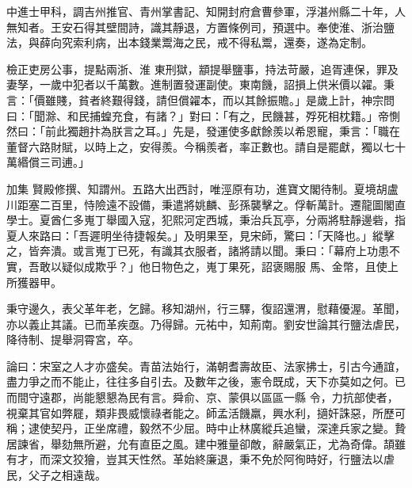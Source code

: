 \begin{pinyinscope}
 中進士甲科，調吉州推官、青州掌書記、知開封府倉曹參軍，浮湛州縣二十年，人無知者。王安石得其壁間詩，識其靜退，方置條例司，預選中。奉使淮、浙治鹽法，與薛向究索利病，出本錢業鬻海之民，戒不得私鬻，還奏，遂為定制。



 檢正吏房公事，提點兩浙、淮
 東刑獄，顓提舉鹽事，持法苛嚴，追胥連保，罪及妻孥，一歲中犯者以千萬數。進制置發運副使。東南饑，詔損上供米價以糴。秉言：「價雖賤，貧者終艱得錢，請但償糴本，而以其餘振贍。」是歲上計，神宗問曰：「聞滁、和民捕蝗充食，有諸？」對曰：「有之，民饑甚，殍死相枕籍。」帝惻然曰：「前此獨趙抃為朕言之耳。」先是，發運使多獻餘羨以希恩寵，秉言：「職在董督六路財賦，以時上之，安得羨。今稱羨者，率正數也。請自是罷獻，獨以七十萬緡償三司逋。」



 加集
 賢殿修撰、知謂州。五路大出西討，唯涇原有功，進寶文閣待制。夏境胡盧川距塞二百里，恃險遠不設備，秉遣將姚麟、彭孫襲擊之。俘斬萬計。遷龍圖閣直學士。夏酋仁多嵬丁舉國入寇，犯熙河定西城，秉治兵瓦亭，分兩將駐靜邊砦，指夏人來路曰：「吾遲明坐待捷報矣。」及明果至，見宋師，驚曰：「天降也。」縱擊之，皆奔潰。或言嵬丁已死，有識其衣服者，諸將請以聞。秉曰：「幕府上功患不實，吾敢以疑似成欺乎？」他日物色之，嵬丁果死，詔褒賜服
 馬、金幣，且使上所獲器甲。



 秉守邊久，表父革年老，乞歸。移知湖州，行三驛，復詔還渭，慰藉優渥。革聞，亦以義止其議。已而革疾亟。乃得歸。元祐中，知荊南。劉安世論其行鹽法虐民，降待制、提舉洞霄宮，卒。



 論曰：宋室之人才亦盛矣。青苗法始行，滿朝耆壽故臣、法家拂士，引古今通誼，盡力爭之而不能止，往往多自引去。及數年之後，憲令既成，天下亦莫如之何。已而間守遠郡，尚能懇懇為民有言。舜俞、京、蒙俱以區區一縣
 令，力抗部使者，視棄其官如弊屣，類非畏威懷祿者能之。師孟活饑羸，興水利，擿奸誅惡，所歷可稱；逮使契丹，正坐席禮，毅然不少屈。時中止林廣縱兵追蠻，深達兵家之變。贄居諫省，舉劾無所避，允有直臣之風。建中雅量卻敵，辭嚴氣正，尤為奇偉。頡雖有才，而深文狡獪，豈其天性然。革始終廉退，秉不免於阿徇時好，行鹽法以虐民，父子之相遠哉。



\end{pinyinscope}